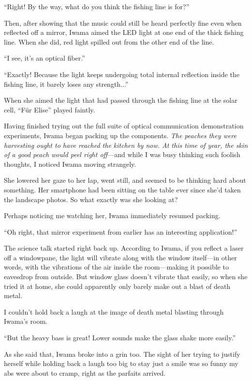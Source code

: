 \documentclass[
    a4paper,
    12pt,
    twoside,
    openany,
    UTF8,
    fontset=windows
]{ctexbook}
\begin{document}
``Right! By the way, what do you think the fishing line is for?''

Then, after showing that the music could still be heard perfectly fine even when reflected off a mirror, Iwama aimed the LED light at one end of the thick fishing line. When she did, red light spilled out from the other end of the line.

``I see, it's an optical fiber.''

``Exactly! Because the light keeps undergoing total internal reflection inside the fishing line, it barely loses any strength...''

When she aimed the light that had passed through the fishing line at the solar cell, ``Für Elise'' played faintly.

Having finished trying out the full suite of optical communication demonstration experiments, Iwama began packing up the components. \textit{The peaches they were harvesting ought to have reached the kitchen by now. At this time of year, the skin of a good peach would peel right off}---and while I was busy thinking such foolish thoughts, I noticed Iwama moving strangely.

She lowered her gaze to her lap, went still, and seemed to be thinking hard about something. Her smartphone had been sitting on the table ever since she'd taken the landscape photos. So what exactly was she looking at?

Perhaps noticing me watching her, Iwama immediately resumed packing.

``Oh right, that mirror experiment from earlier has an interesting application!''

The science talk started right back up. According to Iwama, if you reflect a laser off a windowpane, the light will vibrate along with the window itself---in other words, with the vibrations of the air inside the room---making it possible to eavesdrop from outside. But window glass doesn't vibrate that easily, so when she tried it at home, she could apparently only barely make out a blast of death metal.

I couldn't hold back a laugh at the image of death metal blasting through Iwama's room.

``But the heavy bass is great! Lower sounds make the glass shake more easily.''

As she said that, Iwama broke into a grin too. The sight of her trying to justify herself while holding back a laugh too big to stay just a smile was so funny my abs were about to cramp, right as the parfaits arrived.
\end{document}
